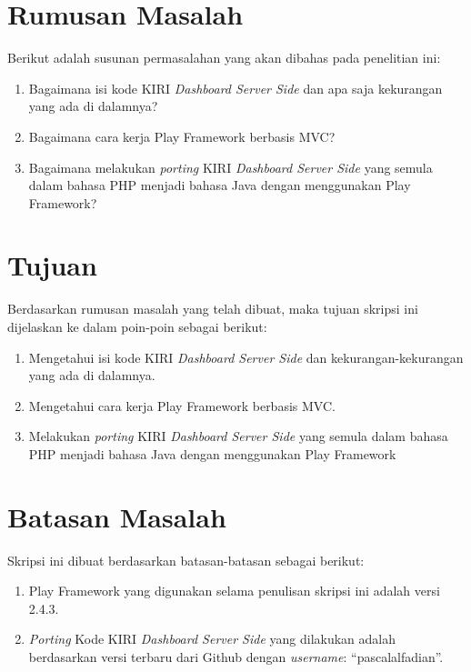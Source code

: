 \section{Rumusan Masalah}
\label{sec:rumusan_masalah}
Berikut adalah susunan permasalahan yang akan dibahas pada penelitian ini:
	\begin{enumerate}
		\item Bagaimana isi kode KIRI \textit{Dashboard Server Side} dan apa saja kekurangan yang ada di dalamnya?
		\item Bagaimana cara kerja Play Framework berbasis MVC?
		\item Bagaimana melakukan \textit{porting} KIRI \textit{Dashboard Server Side} yang semula dalam bahasa PHP menjadi bahasa
Java dengan menggunakan Play Framework?
	\end{enumerate}
	
\section{Tujuan}
\label{sec:tujuan}
Berdasarkan rumusan masalah yang telah dibuat, maka tujuan skripsi ini dijelaskan ke dalam poin-poin sebagai berikut:
	\begin{enumerate}
		\item Mengetahui isi kode KIRI \textit{Dashboard Server Side} dan kekurangan-kekurangan yang ada di dalamnya.
		\item Mengetahui cara kerja Play Framework berbasis MVC.
		\item Melakukan \textit{porting} KIRI \textit{Dashboard Server Side} yang semula dalam bahasa PHP menjadi bahasa
Java dengan menggunakan Play Framework
	\end{enumerate}
	
\section{Batasan Masalah}
\label{sec:batasan_masalah}
Skripsi ini dibuat berdasarkan batasan-batasan sebagai berikut:
	\begin{enumerate}
		\item Play Framework yang digunakan selama penulisan skripsi ini adalah versi 2.4.3.
		\item \textit{Porting} Kode KIRI \textit{Dashboard Server Side} yang dilakukan adalah berdasarkan versi terbaru dari Github dengan \textit{username}: ``pascalalfadian''\cite{kiridashboard}. 
	\end{enumerate}
	
